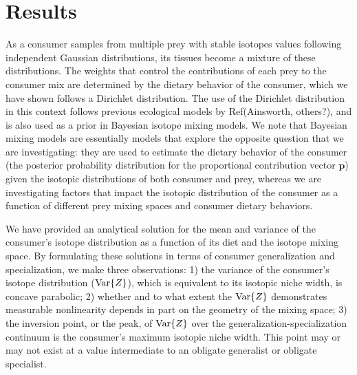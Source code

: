 \documentclass{frontiersSCNS}
\begin{document}
\section{Results}

As a consumer samples from multiple prey with stable isotopes values following independent Gaussian distributions, its tissues become a mixture of these distributions.
The weights that control the contributions of each prey to the consumer mix are determined by the dietary behavior of the consumer, which we have shown follows a Dirichlet distribution.
The use of the Dirichlet distribution in this context follows previous ecological models by Ref(Ainsworth, others?), and is also used as a prior in Bayesian isotope mixing models.
We note that Bayesian mixing models are essentially models that explore the opposite question that we are investigating: they are used to estimate the dietary behavior of the consumer (the posterior probability distribution for the proportional contribution vector $\bm p$) given the isotopic distributions of both consumer and prey, whereas we are investigating factors that impact the isotopic distribution of the consumer as a function of different prey mixing spaces and consumer dietary behaviors.


We have provided an analytical solution for the mean and variance of the consumer's isotope distribution as a function of its diet and the isotope mixing space.
By formulating these solutions in terms of consumer generalization and specialization, we make three observations:
1) the variance of the consumer's isotope distribution (${\rm Var}\{Z\}$), which is equivalent to its isotopic niche width, is concave parabolic;
2) whether and to what extent the ${\rm Var}\{Z\}$ demonstrates measurable nonlinearity depends in part on the geometry of the mixing space;
3) the inversion point, or the peak, of ${\rm Var}\{Z\}$ over the generalization-specialization continuum is the consumer's maximum isotopic niche width.
This point may or may not exist at a value intermediate to an obligate generalist or obligate specialist.



\end{document}
